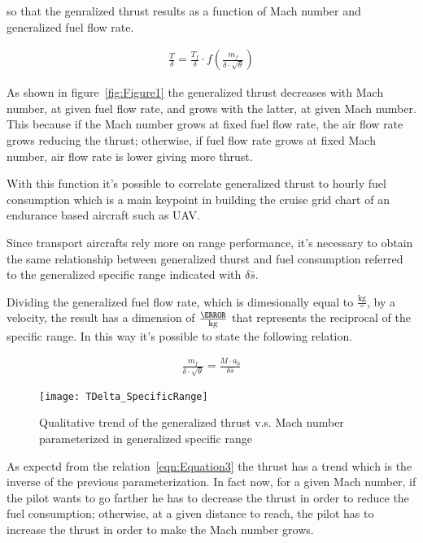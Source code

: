 \noindent
so that the genralized thrust results as a function of Mach number and generalized fuel flow rate.

\begin{eqnarray}
\frac{T}{\delta}=\frac{T_{f}}{\delta}\cdot f\left(\frac{m_{f}}{\delta \cdot \sqrt{\theta}}\right)
\label{eqn:Equation2}
\end{eqnarray}

\noindent
As shown in figure~\ref{fig:Figure1} the generalized thrust decreases with Mach number, at given fuel flow rate, and grows with the latter, at given Mach number. This because if the Mach number grows at fixed fuel flow rate, the air flow rate grows reducing the thrust; otherwise, if fuel flow rate grows at fixed Mach number, air flow rate is lower giving more thrust.

With this function it's possible to correlate generalized thrust to hourly fuel consumption which is a main keypoint in building the cruise grid chart of an endurance based aircraft such as UAV. 

Since transport aircrafts rely more on range performance, it's necessary to obtain the same relationship between generalized thurst and fuel consumption referred to the generalized specific range indicated with $\delta\bar s $. 

\bigskip
\noindent
Dividing the generalized fuel flow rate, which is dimesionally equal to $\frac{\si{\kilogram}}{\second}$, by a velocity, the result has a dimension of $\frac{\meter}{\si{\kilogram}}$ that represents the reciprocal of the specific range. In this way it's possible to state the following relation.

\begin{eqnarray}
\frac{m_{f}}{\delta \cdot \sqrt{\theta}}=\frac{M\cdot a_{0}}{\delta\bar s}
\label{eqn:Equation3}
\end{eqnarray}

\begin{figure}[!ht]
\centering
\texttt{[image: TDelta\_SpecificRange]}
\caption{Qualitative trend of the generalized thrust v.s. Mach number parameterized in generalized specific range}
\label{fig:Figure2}
\end{figure}

\noindent
As expectd from the relation~\ref{eqn:Equation3} the thrust has a trend which is the inverse of the previous parameterization. In fact now, for a given Mach number, if the pilot wants to go farther he has to decrease the thrust in order to reduce the fuel consumption; otherwise, at a given distance to reach, the pilot has to increase the thrust in order to make the Mach number grows.

